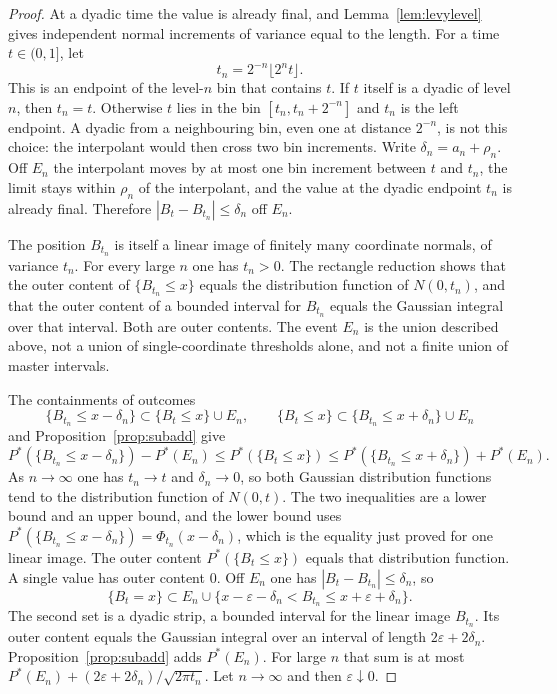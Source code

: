 \begin{proof}
At a dyadic time the value is already final, and Lemma~\ref{lem:levylevel} gives independent normal increments of variance equal to the length. For a time $t\in(0,1]$, let
\[
 t_n=2^{-n}\lfloor 2^nt\rfloor.
\]
This is an endpoint of the level-$n$ bin that contains $t$. If $t$ itself is a dyadic of level $n$, then $t_n=t$. Otherwise $t$ lies in the bin $[t_n,t_n+2^{-n}]$ and $t_n$ is the left endpoint. A dyadic from a neighbouring bin, even one at distance $2^{-n}$, is not this choice: the interpolant would then cross two bin increments. Write $\delta_n=a_n+\rho_n$. Off $E_n$ the interpolant moves by at most one bin increment between $t$ and $t_n$, the limit stays within $\rho_n$ of the interpolant, and the value at the dyadic endpoint $t_n$ is already final. Therefore $|B_t-B_{t_n}|\le\delta_n$ off $E_n$.

The position $B_{t_n}$ is itself a linear image of finitely many coordinate normals, of variance $t_n$. For every large $n$ one has $t_n>0$. The rectangle reduction shows that the outer content of $\{B_{t_n}\le x\}$ equals the distribution function of $N(0,t_n)$, and that the outer content of a bounded interval for $B_{t_n}$ equals the Gaussian integral over that interval. Both are outer contents. The event $E_n$ is the union described above, not a union of single-coordinate thresholds alone, and not a finite union of master intervals.

The containments of outcomes
\[
 \{B_{t_n}\le x-\delta_n\}\subset\{B_t\le x\}\cup E_n,
 \qquad
 \{B_t\le x\}\subset\{B_{t_n}\le x+\delta_n\}\cup E_n
\]
and Proposition~\ref{prop:subadd} give
\[
 P^*(\{B_{t_n}\le x-\delta_n\})-P^*(E_n)
 \le P^*(\{B_t\le x\})
 \le P^*(\{B_{t_n}\le x+\delta_n\})+P^*(E_n).
\]
As $n\to\infty$ one has $t_n\to t$ and $\delta_n\to0$, so both Gaussian distribution functions tend to the distribution function of $N(0,t)$. The two inequalities are a lower bound and an upper bound, and the lower bound uses $P^*(\{B_{t_n}\le x-\delta_n\})=\Phi_{t_n}(x-\delta_n)$, which is the equality just proved for one linear image. The outer content $P^*(\{B_t\le x\})$ equals that distribution function. A single value has outer content $0$. Off $E_n$ one has $|B_t-B_{t_n}|\le\delta_n$, so
\[
 \{B_t=x\}\subset E_n\cup\{x-\varepsilon-\delta_n<B_{t_n}\le x+\varepsilon+\delta_n\}.
\]
The second set is a dyadic strip, a bounded interval for the linear image $B_{t_n}$. Its outer content equals the Gaussian integral over an interval of length $2\varepsilon+2\delta_n$. Proposition~\ref{prop:subadd} adds $P^*(E_n)$. For large $n$ that sum is at most $P^*(E_n)+(2\varepsilon+2\delta_n)/\sqrt{2\pi t_n}$. Let $n\to\infty$ and then $\varepsilon\downarrow0$.


\end{proof}
